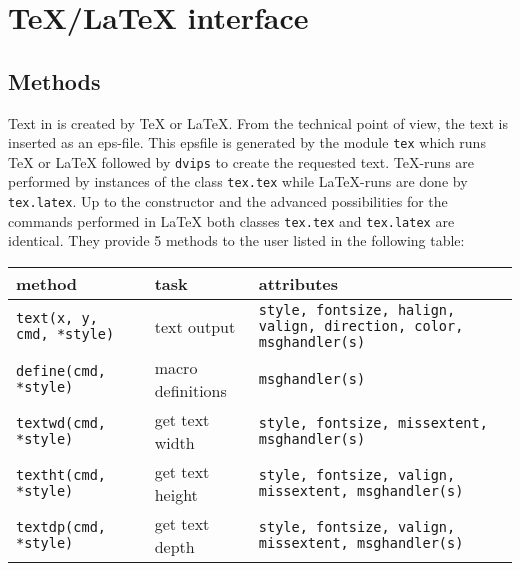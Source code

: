 \section{\TeX/\LaTeX{} interface}
\subsection{Methods}
\label{tex}
Text in \PyX{} is created by \TeX{} or \LaTeX. From the technical point
of view, the text is inserted as an eps-file. This epsfile is generated
by the module \verb|tex| which runs \TeX{} or \LaTeX{} followed by
\verb|dvips| to create the requested text. \TeX-runs are performed by
instances of the class \verb|tex.tex| while \LaTeX-runs are done by
\verb|tex.latex|. Up to the constructor and the advanced possibilities
for the commands performed in \LaTeX{} both classes \verb|tex.tex| and
\verb|tex.latex| are identical. They provide 5 methods to the user
listed in the following table:

\bigskip
\begin{tabularx}{\linewidth}{ll>{\raggedright\arraybackslash}X}
method&task&attributes\\
\hline
\texttt{text(x, y, cmd, *style)}&text output&\texttt{style, fontsize, halign, valign, direction, color, msghandler(s)}\\
\texttt{define(cmd, *style)}&macro definitions&\texttt{msghandler(s)}\\
\texttt{textwd(cmd, *style)}&get text width&\texttt{style, fontsize, missextent, msghandler(s)}\\
\texttt{textht(cmd, *style)}&get text height&\texttt{style, fontsize, valign, missextent, msghandler(s)}\\
\texttt{textdp(cmd, *style)}&get text depth&\texttt{style, fontsize, valign, missextent, msghandler(s)}\\
\end{tabularx}
\bigskip

